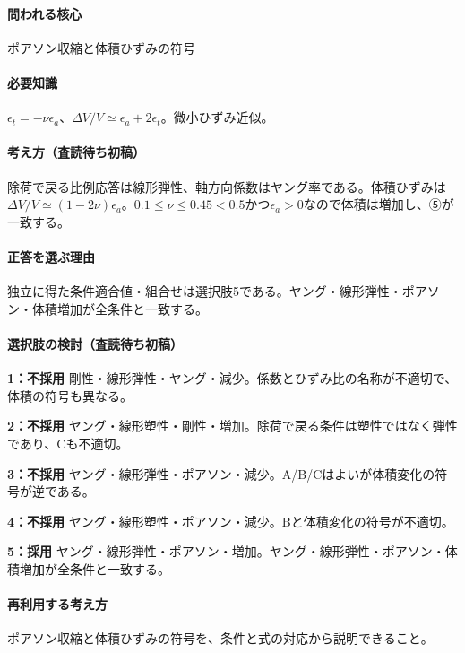 \paragraph{問われる核心} ポアソン収縮と体積ひずみの符号

\paragraph{必要知識} \(\epsilon_t=-\nu\epsilon_a\)、\(\Delta V/V\simeq\epsilon_a+2\epsilon_t\)。微小ひずみ近似。

\paragraph{考え方（査読待ち初稿）} 除荷で戻る比例応答は線形弾性、軸方向係数はヤング率である。体積ひずみは\(\Delta V/V\simeq(1-2\nu)\epsilon_a\)。\(0.1\le\nu\le0.45<0.5\)かつ\(\epsilon_a>0\)なので体積は増加し、⑤が一致する。

\paragraph{正答を選ぶ理由} 独立に得た条件適合値・組合せは選択肢5である。ヤング・線形弾性・ポアソン・体積増加が全条件と一致する。

\paragraph{選択肢の検討（査読待ち初稿）}

\noindent\textbf{1：不採用} 剛性・線形弾性・ヤング・減少。係数とひずみ比の名称が不適切で、体積の符号も異なる。\par

\noindent\textbf{2：不採用} ヤング・線形塑性・剛性・増加。除荷で戻る条件は塑性ではなく弾性であり、Cも不適切。\par

\noindent\textbf{3：不採用} ヤング・線形弾性・ポアソン・減少。A/B/Cはよいが体積変化の符号が逆である。\par

\noindent\textbf{4：不採用} ヤング・線形塑性・ポアソン・減少。Bと体積変化の符号が不適切。\par

\noindent\textbf{5：採用} ヤング・線形弾性・ポアソン・増加。ヤング・線形弾性・ポアソン・体積増加が全条件と一致する。\par

\paragraph{再利用する考え方} ポアソン収縮と体積ひずみの符号を、条件と式の対応から説明できること。

